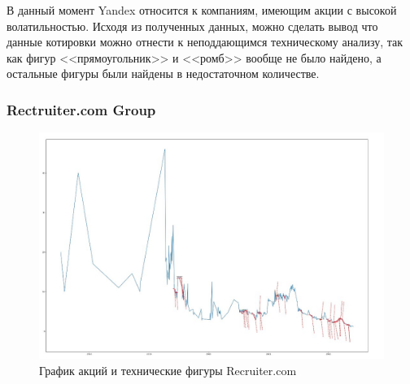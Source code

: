\documentclass[bachelor, och, coursework]{SCWorks}
\begin{document}
    В данный момент Yandex относится к компаниям, имеющим акции с 
    высокой волатильностью. Исходя из полученных данных, можно сделать вывод
    что данные котировки можно отнести к неподдающимся техническому анализу, 
    так как фигур <<прямоугольник>> и <<ромб>> вообще не было найдено, а
    остальные фигуры были найдены в недостаточном количестве.
    

    \subsubsection{Rectruiter.com Group}
    
    \begin{figure}[H]
        \centering
        \includegraphics[width=\textwidth]{pic/RCRT.jpg}
        \caption{График акций и технические фигуры Recruiter.com}
    \end{figure}
   
\end{document}

